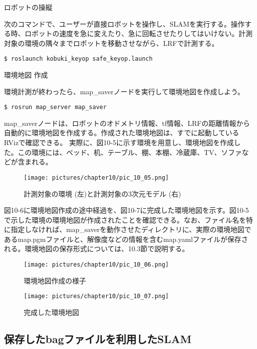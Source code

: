\circled{\thenum} ロボットの操縦

次のコマンドで、ユーザーが直接ロボットを操作し、SLAMを実行する。操作する時、ロボットの速度を急に変えたり、急に回転させたりしてはいけない。計測対象の環境の隅々までロボットを移動させながら、LRFで計測する。

\begin{lstlisting}[language=ROS]
$ roslaunch kobuki_keyop safe_keyop.launch
\end{lstlisting}

\circled{\thenum} 環境地図 作成

環境計測が終わったら、map\_saverノードを実行して環境地図を作成しよう。

\begin{lstlisting}[language=ROS]
$ rosrun map_server map_saver
\end{lstlisting}

map\_saverノードは、ロボットのオドメトリ情報、tf情報、LRFの距離情報から自動的に環境地図を作成する。作成された環境地図は、すでに起動しているRVizで確認できる。
実際に、図10-5に示す環境を用意し、環境地図を作成した。この環境には、ベッド、机、テーブル、棚、本棚、冷蔵庫、TV、ソファなどが含まれる。

\begin{figure}[htp]
  \centering
  \texttt{[image: pictures/chapter10/pic\_10\_05.png]}
  \caption{計測対象の環境 (左)と計測対象の3次元モデル (右)}
\end{figure}

図10-6に環境地図作成の途中経過を、図10-7に完成した環境地図を示す。図10-5で示した環境の環境地図が作成されたことを確認できる。なお、ファイル名を特に指定しなければ、map\_saverを動作させたディレクトリに、実際の環境地図であるmap.pgmファイルと、解像度などの情報を含むmap.yamlファイルが保存される。環境地図の保存形式については、10.3節で説明する。

\begin{figure}[htp]
  \centering
  \texttt{[image: pictures/chapter10/pic\_10\_06.png]}
  \caption{環境地図作成の様子}
\end{figure}

\begin{figure}[htp]
  \centering
  \texttt{[image: pictures/chapter10/pic\_10\_07.png]}
  \caption{完成した環境地図}
\end{figure}

\subsection{保存したbagファイルを利用したSLAM}

